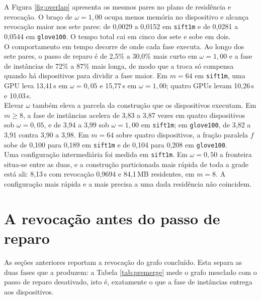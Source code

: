A Figura \ref{fig:overlap} apresenta os mesmos pares no plano de residência e revocação. O braço de $\omega = 1{,}00$ ocupa menos memória no dispositivo e alcança revocação maior nos sete pares: de 0,0029 a 0,0152 em \texttt{sift1m} e de 0,0281 a 0,0544 em \texttt{glove100}. O tempo total cai em cinco dos sete e sobe em dois.\\

O comportamento em tempo decorre de onde cada fase executa. Ao longo dos sete pares, o passo de reparo é de 2,5\% a 30,0\% mais curto em $\omega = 1{,}00$ e a fase de instâncias de 72\% a 87\% mais longa, de modo que a troca só compensa quando há dispositivos para dividir a fase maior. Em $m = 64$ em \texttt{sift1m}, uma \ac{GPU} leva 13,41\,s em $\omega = 0{,}05$ e 15,77\,s em $\omega = 1{,}00$; quatro \ac{GPU}s levam 10,26\,s e 10,03\,s.\\

Elevar $\omega$ também eleva a parcela da construção que os dispositivos executam. Em $m \ge 8$, a fase de instâncias acelera de 3,83 a 3,87 vezes em quatro dispositivos sob $\omega = 0{,}05$, e de 3,94 a 3,99 sob $\omega = 1{,}00$ em \texttt{sift1m}; em \texttt{glove100}, de 3,82 a 3,91 contra 3,90 a 3,98. Em $m = 64$ sobre quatro dispositivos, a fração paralela $f$ sobe de 0,100 para 0,189 em \texttt{sift1m} e de 0,104 para 0,208 em \texttt{glove100}.\\

Uma configuração intermediária foi medida em \texttt{sift1m}. Em $\omega = 0{,}50$ a fronteira situa-se entre as duas, e a construção particionada mais rápida de toda a grade está ali: 8,13\,s com revocação 0,9694 e 84,1\,MB residentes, em $m = 8$. A configuração mais rápida e a mais precisa a uma dada residência não coincidem.\\

\section{A revocação antes do passo de reparo\label{sec:res-premerge}}

As seções anteriores reportam a revocação do grafo concluído. Esta separa as duas fases que a produzem: a Tabela \ref{tab:premerge} mede o grafo mesclado com o passo de reparo desativado, isto é, exatamente o que a fase de instâncias entrega aos dispositivos.\\


